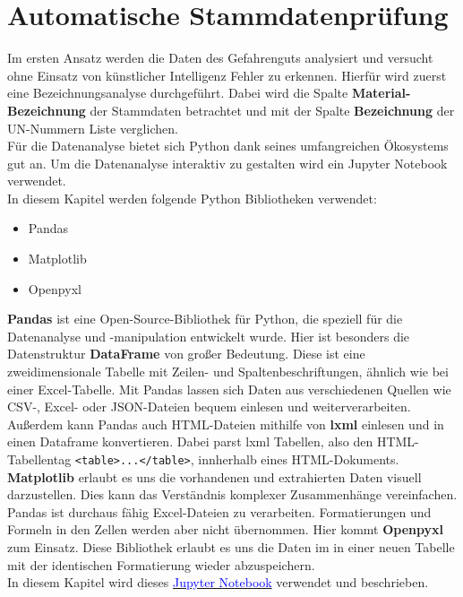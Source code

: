 \section{Automatische Stammdatenprüfung}

Im ersten Ansatz werden die Daten des Gefahrenguts analysiert und versucht ohne
Einsatz von künstlicher Intelligenz Fehler zu erkennen. Hierfür wird zuerst
eine Bezeichnungsanalyse durchgeführt. Dabei wird die Spalte
\textbf{Material-Bezeichnung} der Stammdaten betrachtet und mit der Spalte
\textbf{Bezeichnung} der UN-Nummern Liste verglichen.\\

Für die Datenanalyse bietet sich Python dank seines umfangreichen Ökosystems 
gut an. Um die Datenanalyse interaktiv zu gestalten wird ein Jupyter Notebook
verwendet.\\

In diesem Kapitel werden folgende Python Bibliotheken verwendet:
\begin{itemize}
    \item Pandas
    \item Matplotlib
    \item Openpyxl
\end{itemize}

\textbf{Pandas} ist eine Open-Source-Bibliothek für Python, die speziell für die
Datenanalyse und -manipulation entwickelt wurde. Hier ist besonders die 
Datenstruktur \textbf{DataFrame} von großer Bedeutung. Diese ist eine
zweidimensionale Tabelle mit Zeilen- und Spaltenbeschriftungen, ähnlich wie bei
einer Excel-Tabelle. Mit Pandas lassen sich Daten aus verschiedenen Quellen wie
CSV-, Excel- oder JSON-Dateien bequem einlesen und weiterverarbeiten.
Außerdem kann Pandas auch HTML-Dateien mithilfe von \textbf{lxml} einlesen und
in einen Dataframe konvertieren. Dabei parst lxml Tabellen, also den
HTML-Tabellentag \texttt{<table>...</table>}, innherhalb eines HTML-Dokuments.
\textbf{Matplotlib} erlaubt es uns die vorhandenen und extrahierten Daten
visuell darzustellen. Dies kann das Verständnis komplexer Zusammenhänge 
vereinfachen.
Pandas ist durchaus fähig Excel-Dateien zu verarbeiten. Formatierungen und 
Formeln in den Zellen werden aber nicht übernommen. Hier kommt \textbf{Openpyxl}
zum Einsatz. Diese Bibliothek erlaubt es uns die Daten im in einer neuen Tabelle
mit der identischen Formatierung wieder abzuspeichern.\\

In diesem Kapitel wird dieses 
\href{https://github.com/ckiri/gg/tree/master/notebooks/automatic_error_detection.ipynb}
{\textcolor{blue}{Jupyter Notebook}} verwendet und beschrieben.

